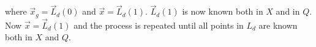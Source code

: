where $\vec{x}_g = \vec{L}_d(0)$ and $\vec{x} = \vec{L}_d(1)$.  $\vec{L}_d(1)$ is now known both in $X$ and in $Q$.  Now $\vec{x} = \vec{L}_d(1)$ and the process is repeated until all points in $L_d$ are known both in $X$ and $Q$.





